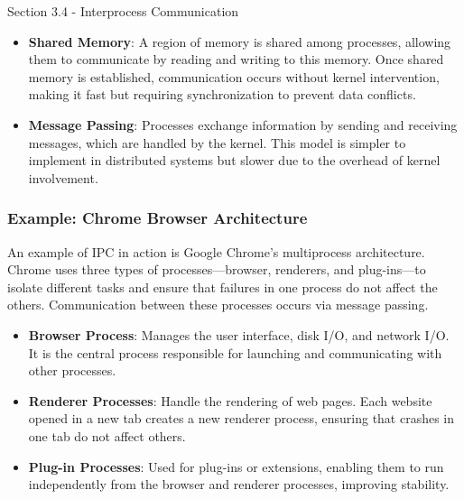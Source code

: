 \begin{notes}{Section 3.4 - Interprocess Communication}
    \begin{highlight}
    
        \begin{itemize}
            \item \textbf{Shared Memory}: A region of memory is shared among processes, allowing them to communicate by reading and writing to this memory. Once shared memory is established, communication 
            occurs without kernel intervention, making it fast but requiring synchronization to prevent data conflicts.
            \item \textbf{Message Passing}: Processes exchange information by sending and receiving messages, which are handled by the kernel. This model is simpler to implement in distributed systems 
            but slower due to the overhead of kernel involvement.
        \end{itemize}
    
    \end{highlight}
    
    \subsubsection*{Example: Chrome Browser Architecture}
    
    An example of IPC in action is Google Chrome's multiprocess architecture. Chrome uses three types of processes—browser, renderers, and plug-ins—to isolate different tasks and ensure that failures 
    in one process do not affect the others. Communication between these processes occurs via message passing.
    
    \begin{highlight}
    
        \begin{itemize}
            \item \textbf{Browser Process}: Manages the user interface, disk I/O, and network I/O. It is the central process responsible for launching and communicating with other processes.
            \item \textbf{Renderer Processes}: Handle the rendering of web pages. Each website opened in a new tab creates a new renderer process, ensuring that crashes in one tab do not affect others.
            \item \textbf{Plug-in Processes}: Used for plug-ins or extensions, enabling them to run independently from the browser and renderer processes, improving stability.
        \end{itemize}
    

\end{highlight}
\end{notes}
